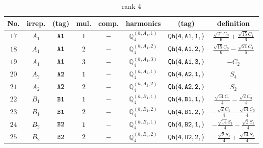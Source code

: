 \documentclass[fleqn,8pt]{jsarticle}
\begin{document}
\begin{table}[ht!]
\begin{center}
\caption{rank 4}
\renewcommand{\arraystretch}{1.3}
\begin{tabular}{cccccccc} \hline \hline
No. & irrep. & (tag) & mul. & comp. & harmonics & (tag) & definition \\ \hline
$ 17 $ & $ A_{1} $ & $ {\tt A1} $ & $ 1 $ & $ - $ & $ \mathbb{Q}_{4}^{(h,A_{1},1)} $ & $ {\tt Qh(4,A1,1,)} $ & $ \frac{\sqrt{21} C_{0}}{6} + \frac{\sqrt{15} C_{4}}{6} $ \\
$ 18 $ & $ A_{1} $ & $ {\tt A1} $ & $ 2 $ & $ - $ & $ \mathbb{Q}_{4}^{(h,A_{1},2)} $ & $ {\tt Qh(4,A1,2,)} $ & $ \frac{\sqrt{15} C_{0}}{6} - \frac{\sqrt{21} C_{4}}{6} $ \\
$ 19 $ & $ A_{1} $ & $ {\tt A1} $ & $ 3 $ & $ - $ & $ \mathbb{Q}_{4}^{(h,A_{1},3)} $ & $ {\tt Qh(4,A1,3,)} $ & $ - C_{2} $ \\
$ 20 $ & $ A_{2} $ & $ {\tt A2} $ & $ 1 $ & $ - $ & $ \mathbb{Q}_{4}^{(h,A_{2},1)} $ & $ {\tt Qh(4,A2,1,)} $ & $ S_{4} $ \\
$ 21 $ & $ A_{2} $ & $ {\tt A2} $ & $ 2 $ & $ - $ & $ \mathbb{Q}_{4}^{(h,A_{2},2)} $ & $ {\tt Qh(4,A2,2,)} $ & $ S_{2} $ \\
$ 22 $ & $ B_{1} $ & $ {\tt B1} $ & $ 1 $ & $ - $ & $ \mathbb{Q}_{4}^{(h,B_{1},1)} $ & $ {\tt Qh(4,B1,1,)} $ & $ \frac{\sqrt{14} C_{1}}{4} - \frac{\sqrt{2} C_{3}}{4} $ \\
$ 23 $ & $ B_{1} $ & $ {\tt B1} $ & $ 2 $ & $ - $ & $ \mathbb{Q}_{4}^{(h,B_{1},2)} $ & $ {\tt Qh(4,B1,2,)} $ & $ - \frac{\sqrt{2} C_{1}}{4} - \frac{\sqrt{14} C_{3}}{4} $ \\
$ 24 $ & $ B_{2} $ & $ {\tt B2} $ & $ 1 $ & $ - $ & $ \mathbb{Q}_{4}^{(h,B_{2},1)} $ & $ {\tt Qh(4,B2,1,)} $ & $ - \frac{\sqrt{14} S_{1}}{4} - \frac{\sqrt{2} S_{3}}{4} $ \\
$ 25 $ & $ B_{2} $ & $ {\tt B2} $ & $ 2 $ & $ - $ & $ \mathbb{Q}_{4}^{(h,B_{2},2)} $ & $ {\tt Qh(4,B2,2,)} $ & $ - \frac{\sqrt{2} S_{1}}{4} + \frac{\sqrt{14} S_{3}}{4} $ \\
 \hline \hline
\end{tabular}
\end{center}
\end{table}
\end{document}
